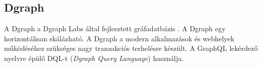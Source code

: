 \subsection{Dgraph}

A Dgraph a Dgraph Labs által fejlesztett gráfadatbázis \cite{dgraph}. A Dgraph egy horizontálisan skálázható. A Dgraph a modern alkalmazások és webhelyek működéséhez szükséges nagy tranzakciós terhelésre készült. A GraphQL lekérdező nyelvre épülő DQL-t (\textit{Dgraph Query Language}) használja.
